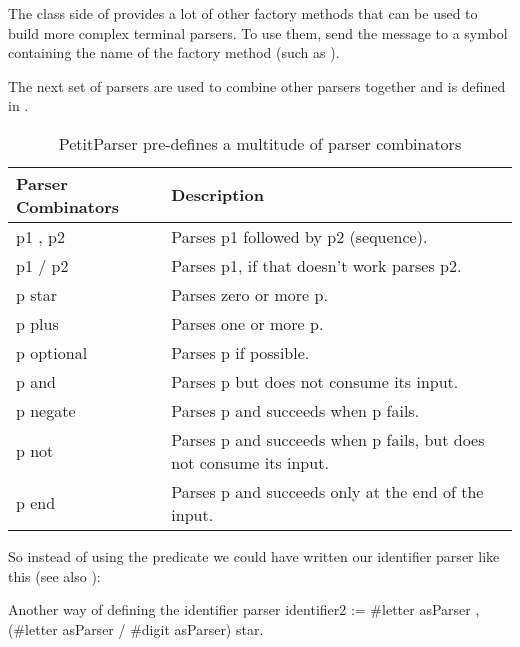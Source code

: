 \documentclass[a4paper,10pt,twoside]{book}
\begin{document}
The class side of  provides a lot of other
factory methods that can be used to build more complex terminal
parsers. To use them, send the message  to a symbol
containing the name of the factory method (such as 
).

The next set of parsers are used to combine other parsers together and
is defined in .

\begin{table}
  \centering
  \begin{tabular}{lp{}}
    \textbf{Parser Combinators} & \textbf{Description}                                                \\
    \midrule
    p1 , p2                     & Parses p1 followed by p2 (sequence).                                \\
    p1 / p2                     & Parses p1, if that doesn't work parses p2.                          \\
    p star                      & Parses zero or more p.                                              \\
    p plus                      & Parses one or more p.                                               \\
    p optional                  & Parses p if possible.                                               \\
    p and                       & Parses p but does not consume its input.                            \\
    p negate                    & Parses p and succeeds when p fails.                                 \\
    p not                       & Parses p and succeeds when p fails, but does not consume its input. \\
    p end                       & Parses p and succeeds only at the end of the input.                 \\
  \end{tabular}
  \caption{PetitParser pre-defines a multitude of parser combinators}
  \label{tab:parser-combinators}
\end{table}

So instead of using the  predicate we could have written
our identifier parser like this (see also ):

\begin{script}[identifier2]{Another way of defining the identifier parser}
identifier2 := #letter asParser , (#letter asParser / #digit asParser) star.
\end{script}
\end{document}
